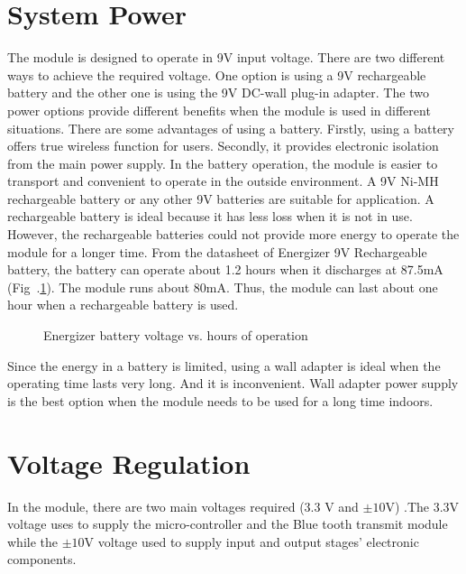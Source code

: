 \section{System Power} \label{sys_power}
The module is designed to operate in 9V input voltage.  There are two different ways to achieve the required voltage. One option is using a 9V rechargeable battery and the other one is using the 9V DC-wall plug-in adapter.  The two power options provide different benefits when the module is used in different situations. There are some advantages of using a battery. Firstly, using a battery offers true wireless function for users. Secondly, it provides electronic isolation from the main power supply.  In the battery operation, the module is easier to transport and convenient to operate in the outside environment.  A 9V Ni-MH rechargeable battery or any other 9V batteries are suitable for application. A rechargeable battery is ideal because it has less loss when it is not in use. However, the rechargeable batteries could not provide more energy to operate the module for a longer time. From the datasheet of Energizer 9V Rechargeable battery, the battery can operate about 1.2 hours when it discharges at 87.5mA (Fig~.\ref{fig:battery}). The module runs about 80mA.  Thus, the module can last about one hour when a rechargeable battery is used.

\begin{figure}[!tbh]
	\centering
	\caption{Energizer battery voltage vs. hours of operation\cite{energizer_datasheet}}
	\label{fig:battery}
\end{figure}

Since the energy in a battery is limited, using a wall adapter is ideal when the operating time lasts very long. And it is inconvenient. Wall adapter power supply is the best option when the module needs to be used for a long time indoors.

\section{Voltage Regulation}
In the module, there are two main voltages required (3.3 V and $\pm10$V) .The 3.3V voltage uses to supply the micro-controller and the Blue tooth transmit module while the $\pm10$V voltage used to supply input and output stages’ electronic components.

